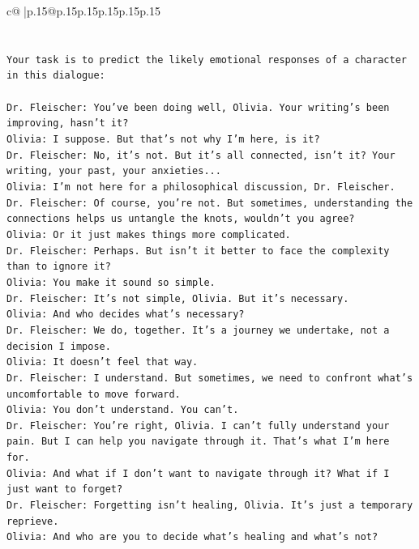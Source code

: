 \documentclass{article}
\begin{document}
{\begin{supertabular}{c@{$\;$}|p{.15\linewidth}@{}p{.15\linewidth}p{.15\linewidth}p{.15\linewidth}p{.15\linewidth}p{.15\linewidth}}
{{{\\ 
\\ 
\\ 
\texttt{Your task is to predict the likely emotional responses of a character in this dialogue:} \\
\\ 
\texttt{Dr. Fleischer: You've been doing well, Olivia. Your writing's been improving, hasn't it?} \\
\texttt{Olivia: I suppose. But that's not why I'm here, is it?} \\
\texttt{Dr. Fleischer: No, it's not. But it's all connected, isn't it? Your writing, your past, your anxieties...} \\
\texttt{Olivia: I'm not here for a philosophical discussion, Dr. Fleischer.} \\
\texttt{Dr. Fleischer: Of course, you're not. But sometimes, understanding the connections helps us untangle the knots, wouldn't you agree?} \\
\texttt{Olivia: Or it just makes things more complicated.} \\
\texttt{Dr. Fleischer: Perhaps. But isn't it better to face the complexity than to ignore it?} \\
\texttt{Olivia: You make it sound so simple.} \\
\texttt{Dr. Fleischer: It's not simple, Olivia. But it's necessary.} \\
\texttt{Olivia: And who decides what's necessary?} \\
\texttt{Dr. Fleischer: We do, together. It's a journey we undertake, not a decision I impose.} \\
\texttt{Olivia: It doesn't feel that way.} \\
\texttt{Dr. Fleischer: I understand. But sometimes, we need to confront what's uncomfortable to move forward.} \\
\texttt{Olivia: You don't understand. You can't.} \\
\texttt{Dr. Fleischer: You're right, Olivia. I can't fully understand your pain. But I can help you navigate through it. That's what I'm here for.} \\
\texttt{Olivia: And what if I don't want to navigate through it? What if I just want to forget?} \\
\texttt{Dr. Fleischer: Forgetting isn't healing, Olivia. It's just a temporary reprieve.} \\
\texttt{Olivia: And who are you to decide what's healing and what's not?} \\
}}}
\end{supertabular}}
\end{document}
